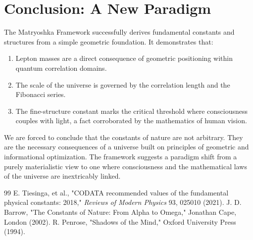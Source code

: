 \documentclass[12pt,a4paper,twocolumn]{article}
\begin{document}
\section{Conclusion: A New Paradigm}
The Matryoshka Framework successfully derives fundamental constants and structures from a simple geometric foundation. It demonstrates that:
\begin{enumerate}
    \item Lepton masses are a direct consequence of geometric positioning within quantum correlation domains.
    \item The scale of the universe is governed by the correlation length and the Fibonacci series.
    \item The fine-structure constant marks the critical threshold where consciousness couples with light, a fact corroborated by the mathematics of human vision.
\end{enumerate}

We are forced to conclude that the constants of nature are not arbitrary. They are the necessary consequences of a universe built on principles of geometric and informational optimization. The framework suggests a paradigm shift from a purely materialistic view to one where consciousness and the mathematical laws of the universe are inextricably linked.

\begin{thebibliography}{99}
     E. Tiesinga, et al., "CODATA recommended values of the fundamental physical constants: 2018," \textit{Reviews of Modern Physics} 93, 025010 (2021).
     J. D. Barrow, "The Constants of Nature: From Alpha to Omega," Jonathan Cape, London (2002).
     R. Penrose, "Shadows of the Mind," Oxford University Press (1994).
\end{thebibliography}
\end{document}
